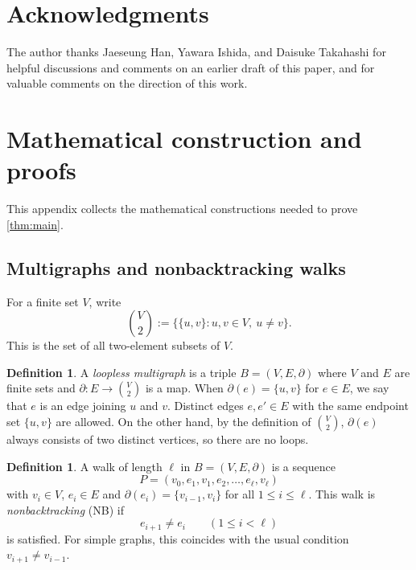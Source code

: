 \documentclass[11pt]{article}
\theoremstyle{definition}
\newtheorem{definition}[theorem]{Definition}
\theoremstyle{remark}
\renewcommand{\_}{\textunderscore\allowbreak}
\begin{document}
\section*{Acknowledgments}\label{acknowledgments}

The author thanks Jaeseung Han, Yawara Ishida, and Daisuke Takahashi for
helpful discussions and comments on an earlier draft of this paper, and
for valuable comments on the direction of this work.


\appendix

\section{Mathematical construction and
proofs}\label{appendix-a.-mathematical-construction-and-proofs}

This appendix collects the mathematical constructions needed to prove
\cref{thm:main}.

\subsection{Multigraphs and nonbacktracking
walks}\label{a.1-multigraphs-and-nonbacktracking-walks}

For a finite set \(V\), write \[
  \binom{V}{2}:=\bigl\{\{u,v\}:u,v\in V,\ u\ne v\bigr\} .
\] This is the set of all two-element subsets of \(V\).

\begin{definition}\label{def:multigraph}
A \emph{loopless multigraph} is a triple
\(B=(V,E,\partial)\) where \(V\) and \(E\) are finite sets and
\(\partial:E\to\binom{V}{2}\) is a map. When \(\partial(e)=\{u,v\}\) for
\(e\in E\), we say that \(e\) is an edge joining \(u\) and \(v\).
Distinct edges \(e,e'\in E\) with the same endpoint set \(\{u,v\}\) are
allowed. On the other hand, by the definition of \(\binom{V}{2}\),
\(\partial(e)\) always consists of two distinct vertices, so there are
no loops.
\end{definition}

\begin{definition}\label{def:walk}
A walk of length \(\ell\) in
\(B=(V,E,\partial)\) is a sequence \[
  P=(v_0,e_1,v_1,e_2,\ldots,e_\ell,v_\ell)
\] with \(v_i\in V\), \(e_i\in E\) and \(\partial(e_i)=\{v_{i-1},v_i\}\)
for all \(1\le i\le\ell\). This walk is \emph{nonbacktracking} (NB) if
\[
  e_{i+1}\ne e_i\qquad(1\le i<\ell)
\] is satisfied. For simple graphs, this coincides with the usual
condition \(v_{i+1}\ne v_{i-1}\).
\end{definition}
\end{document}
